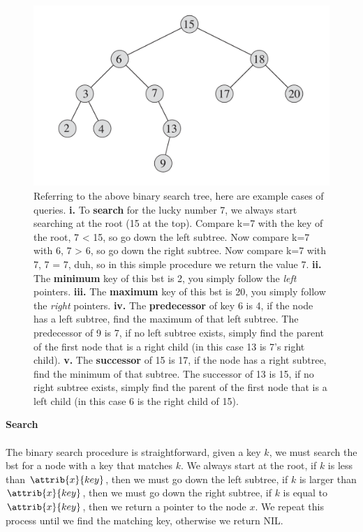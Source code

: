 \documentclass{article}
\begin{document}
\begin{figure}[!ht]
\includegraphics[scale=0.3]{bst1}
\caption{
    Referring to the above binary search tree, here are example cases of queries.
    \textbf{i.} To \textbf{search} for the lucky number 7, we always start searching at the root (15 at the top). Compare k=7 with the key of the root, 7 < 15, so go down the left subtree. Now compare k=7 with 6, 7 > 6, so go down the right subtree. Now compare k=7 with 7, 7 = 7, duh, so in this simple procedure we return the value 7.
    \textbf{ii.} The \textbf{minimum} key of this bst is 2, you simply follow the \textit{left} pointers.
    \textbf{iii.} The \textbf{maximum} key of this bst is 20, you simply follow the \textit{right} pointers.
    \textbf{iv.} The \textbf{predecessor} of key 6 is 4, if the node has a left subtree, find the maximum of that left subtree. The predecessor of 9 is 7, if no left subtree exists, simply find the parent of the first node that is a right child (in this case 13 is 7's right child).
    \textbf{v.} The \textbf{successor} of 15 is 17, if the node has a right subtree, find the minimum of that subtree. The successor of 13 is 15, if no right subtree exists, simply find the parent of the first node that is a left child (in this case 6 is the right child of 15).
}
\label{fig:bst_example1}
\end{figure}
\newpage

\textbf{Search}
\\ \\
The binary search procedure is straightforward, given a key $k$, we must search the bst for a node with a key that matches $k$. We always start at the root, if $k$ is less than $\attrib{x}{key}$, then we must go down the left subtree, if $k$ is larger than $\attrib{x}{key}$, then we must go down the right subtree, if $k$ is equal to $\attrib{x}{key}$, then we return a pointer to the node $x$. We repeat this process until we find the matching key, otherwise we return NIL.
\end{document}
